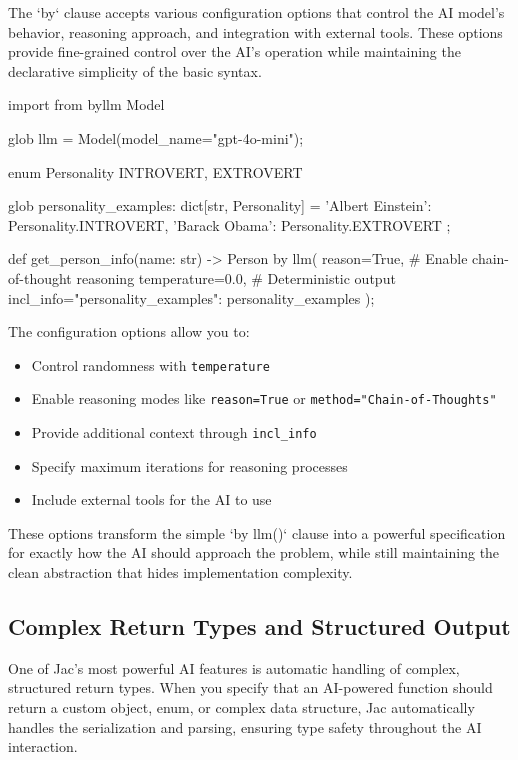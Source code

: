 The `by` clause accepts various configuration options that control the AI model's behavior, reasoning approach, and integration with external tools. These options provide fine-grained control over the AI's operation while maintaining the declarative simplicity of the basic syntax.

\begin{jacblock}
import from byllm { Model }

glob llm = Model(model_name="gpt-4o-mini");

enum Personality { INTROVERT, EXTROVERT }

glob personality_examples: dict[str, Personality] = {
    'Albert Einstein': Personality.INTROVERT,
    'Barack Obama': Personality.EXTROVERT
};

def get_person_info(name: str) -> Person by llm(
    reason=True,                    # Enable chain-of-thought reasoning
    temperature=0.0,                # Deterministic output
    incl_info={"personality_examples": personality_examples}
);
\end{jacblock}

The configuration options allow you to:
\begin{itemize}
    \item Control randomness with \texttt{temperature}
    \item Enable reasoning modes like \texttt{reason=True} or \texttt{method="Chain-of-Thoughts"}
    \item Provide additional context through \texttt{incl\_info}
    \item Specify maximum iterations for reasoning processes
    \item Include external tools for the AI to use
\end{itemize}

These options transform the simple `by llm()` clause into a powerful specification for exactly how the AI should approach the problem, while still maintaining the clean abstraction that hides implementation complexity.

\subsection{Complex Return Types and Structured Output}

One of Jac's most powerful AI features is automatic handling of complex, structured return types. When you specify that an AI-powered function should return a custom object, enum, or complex data structure, Jac automatically handles the serialization and parsing, ensuring type safety throughout the AI interaction.

